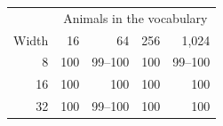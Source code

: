 \begin{tabular}{@{}rrrrr@{}}
\toprule
 & \multicolumn{4}{c}{Animals in the vocabulary} \\
Width & 16 & 64 & 256 & 1{,}024 \\
\midrule
8 & 100 & 99--100 & 100 & 99--100 \\
16 & 100 & 100 & 100 & 100 \\
32 & 100 & 99--100 & 100 & 100 \\
\bottomrule
\end{tabular}
